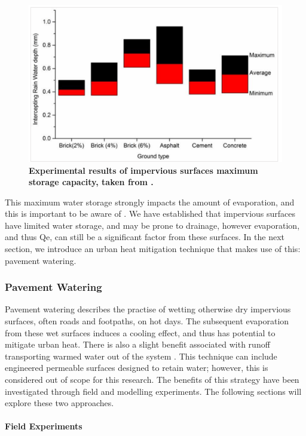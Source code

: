 \documentclass[final,3p,times,authoryear]{elsarticle}
\begin{document}
\begin{figure}
\centering
\includegraphics[trim={0 0 0 0},clip,scale=0.7]{Impervious.png}
\caption{\bf Experimental results of impervious surfaces maximum storage capacity, taken from \cite{Zhou2021a}.}
 \label{fig:7.2}
\end{figure}

This maximum water storage strongly impacts the amount of evaporation, and this is
important to be aware of \citep{Wouters2013}. We have established that impervious surfaces have limited water storage, and may be prone to drainage, however evaporation, and thus \gls{Qe}, can still be a significant factor from these surfaces. In the next section, we introduce an urban heat mitigation technique that makes use of this: pavement watering.

\subsubsection{Pavement Watering}\label{sec:appendix7.1.4_}

Pavement watering describes the practise of wetting otherwise dry impervious surfaces, often roads and footpaths, on hot days. The subsequent evaporation from these wet surfaces induces a cooling effect, and thus has potential to mitigate urban heat. There is also a slight benefit associated with runoff transporting warmed water out of the system \citep{Hendel2020}. This technique can include engineered permeable surfaces designed to retain water; however, this is considered out of scope for this research. The benefits of this strategy have been investigated through field and modelling experiments. The following sections will explore these two approaches.

\paragraph{Field Experiments}\label{sec:appendix7.1.4.1}
\end{document}
